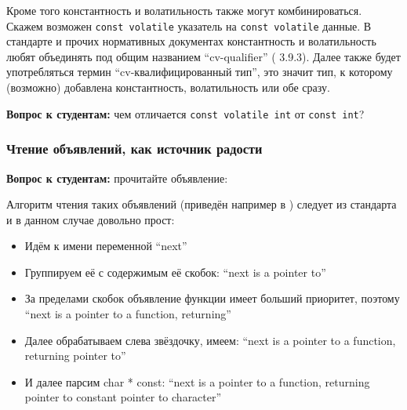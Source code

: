 \documentclass[a4paper,12pt,oneside]{article}
\newif\ifanswers
\begin{document}
Кроме того константность и волатильность также могут комбинироваться. Скажем возможен \lstinline!const volatile! указатель на \lstinline!const volatile! данные. В стандарте и прочих нормативных документах константность и волатильность любят объединять под общим названием ``cv-qualifier'' (\cite{stdcpp14} 3.9.3). Далее также будет употребляться термин ``cv-квалифицированный тип'', это значит тип, к которому (возможно) добавлена константность, волатильность или обе сразу.

\textbf{Вопрос к студентам:} чем отличается \lstinline!const volatile int! от \lstinline!const int!?

\ifanswers
Правильный ответ: константность означает, что оттуда можно только читать. При этом волатильность означает, что чтения оттуда нельзя переупорядочивать. Интересно, что здесь \lstinline!const! это по сути способ сказать \lstinline!readonly!, чем семантически выразить неизменность данных.
\fi

\subsubsection{Чтение объявлений, как источник радости}\label{AlgDecl}

\textbf{Вопрос к студентам:} прочитайте объявление:



\ifanswers
Правильный ответ: указатель на функцию, возвращающую указатель на константный указатель на символ.
\fi

Алгоритм чтения таких объявлений (приведён например в \cite{linden}) следует из стандарта и в данном случае довольно прост:

\begin{itemize}
\item
Идём к имени переменной ``next''
\item
Группируем её с содержимым её скобок: ``next is a pointer to''
\item
За пределами скобок объявление функции имеет больший приоритет, поэтому ``next is a pointer to a function, returning''
\item
Далее обрабатываем слева звёздочку, имеем: ``next is a pointer to a function, returning pointer to''
\item
И далее парсим char * const: ``next is a pointer to a function, returning pointer to constant pointer to character''
\end{itemize}
\end{document}
